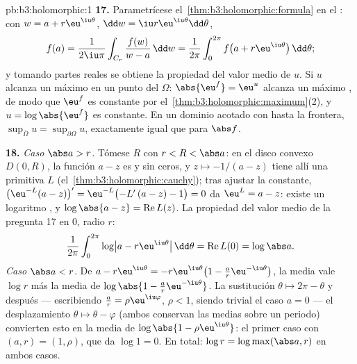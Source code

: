 \begin{solution}{pb:b3:holomorphic:1}
\textbf{17.} Parametrícese el~\cref{thm:b3:holomorphic:formula} en el
: con $w = a + r\eu^{\iu\theta}$,
$\dd w = \iu
r\eu^{\iu\theta}\dd\theta$,
\[
f(a) = \frac1{2\iu\pi}\int_{C_r}\frac{f(w)}{w - a}\,\dd w
= \frac1{2\pi}\int_0^{2\pi}
f\bigl(a + r\eu^{\iu\theta}\bigr)\,\dd\theta ;
\]
y tomando partes reales se obtiene la propiedad del valor medio de $u$.
Si $u$ alcanza un máximo en un punto
 del
 $\Omega$:
$\abs{\eu^f} = \eu^u$ alcanza un máximo
, de modo que $\eu^f$ es
constante por el~\cref{thm:b3:holomorphic:maximum}(2), y $u =
\log\abs{\eu^f}$ es constante. En un dominio acotado con
 hasta la frontera,
$\sup_{\bar\Omega}u =
\sup_{\partial\Omega}u$, exactamente igual que para $\abs f$.

\textbf{18.} \emph{Caso $\abs a > r$.} Tómese $R$ con $r < R
< \abs a$: en el disco convexo $D(0, R)$, la función $a - z$ es
 y sin ceros, y
$z \mapsto -1/(a - z)$ tiene allí una primitiva $L$
(el~\cref{thm:b3:holomorphic:cauchy}); tras ajustar la constante,
$\bigl(\eu^{-L}(a -
z)\bigr)' = \eu^{-L}\bigl(-L'\,(a - z) - 1\bigr) = 0$ da
$\eu^L = a - z$: existe un logaritmo
, y
$\log\abs{a - z} = \operatorname{Re}L(z)$. La propiedad del valor medio
de la pregunta 17 en $0$, radio $r$:
\[
\frac1{2\pi}\int_0^{2\pi}
\log\bigl|a - r\eu^{\iu\theta}\bigr|\,\dd\theta
= \operatorname{Re}L(0) = \log\abs a .
\]
\emph{Caso $\abs a < r$.} De $a - r\eu^{\iu\theta} =
-r\eu^{\iu\theta}\bigl(1 - \frac ar\eu^{-\iu\theta}\bigr)$, la media
vale $\log r$ más la media de $\log\abs{1 -
\frac ar\eu^{-\iu\theta}}$. La sustitución $\theta \mapsto
2\pi - \theta$ y después --- escribiendo $\frac ar =
\rho\eu^{\iu\varphi}$, $\rho < 1$, siendo trivial el caso $a = 0$ --- el
desplazamiento $\theta \mapsto \theta - \varphi$ (ambos conservan las
medias sobre un periodo) convierten esto en la media de
$\log\abs{1 - \rho\eu^{\iu\theta}}$: el primer caso con
$(a, r) = (1, \rho)$, que da $\log 1 = 0$. En total:
$\log r = \log\max(\abs a, r)$ en ambos casos.


\end{solution}
